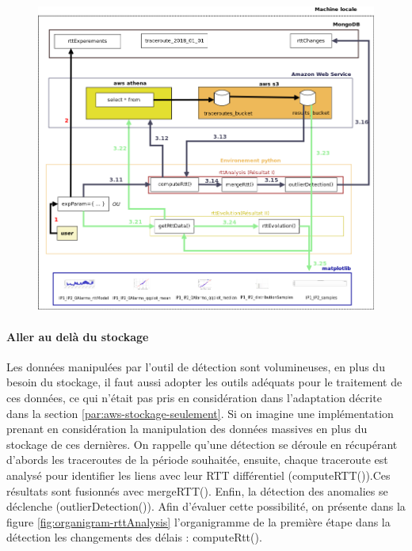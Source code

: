 \begin{figure}[H]
\centering
\includegraphics[width=1\linewidth]{illustrations/travail-de-reference-avec-athena}
\caption{}
\label{fig:travail-de-reference-avec-athena}
\end{figure}

\paragraph{Aller au delà du stockage }

Les données manipulées par l'outil de détection sont volumineuses, en plus du besoin du stockage, il faut aussi adopter les outils adéquats pour le traitement de ces données, ce qui n'était pas pris en considération dans l'adaptation décrite dans la section \ref{par:aws-stockage-seulement}.  Si on imagine une implémentation prenant en considération la manipulation des données massives en plus du stockage de ces dernières. On rappelle qu'une détection se déroule en récupérant d'abords les traceroutes de la période souhaitée, ensuite, chaque traceroute est analysé pour identifier les liens avec leur RTT différentiel (computeRTT()).Ces résultats sont fusionnés avec mergeRTT(). Enfin, la détection des anomalies se déclenche (outlierDetection()). Afin d'évaluer cette possibilité, on présente dans la figure \ref{fig:organigram-rttAnalysis} l'organigramme de la première étape dans la détection les changements des délais : computeRtt(). 

